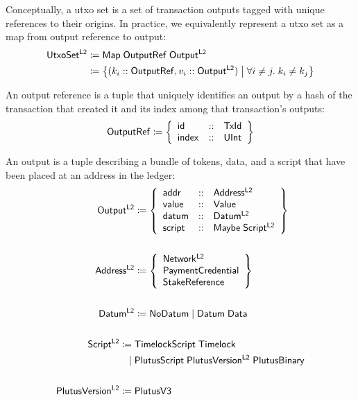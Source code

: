\documentclass[../hydrozoa.tex]{subfiles}
\begin{document}
Conceptually, a utxo set is a set of transaction outputs tagged with unique references to their origins.
In practice, we equivalently represent a utxo set as a map from output reference to output:
\begin{equation*}
\begin{split}
  \mathsf{UtxoSet^{L2}} &\coloneq \mathsf{Map} \; \mathsf{OutputRef} \; \mathsf{Output^{L2}} \\
    &\coloneq \left\{
      (k_i :: \mathsf{OutputRef}, v_i :: \mathsf{Output^{L2}})
      \;\middle|\;
      \forall i \neq j.\; k_i \neq k_j
    \right\}
\end{split}
\end{equation*}

An output reference is a tuple that uniquely identifies an output by a hash of the transaction that created it and its index among that transaction's outputs:
\begin{equation*}
  \mathsf{OutputRef} \coloneq \left\{
    \begin{array}{lll}
      \mathsf{id} &::& \mathsf{TxId} \\
      \mathsf{index} &::& \mathsf{UInt}
    \end{array} \right\}
\end{equation*}

An output is a tuple describing a bundle of tokens, data, and a script that have been placed at an address in the ledger:
\begin{equation*}
\begin{split}
  \mathsf{Output^{L2}} &\coloneq \left\{
  \begin{array}{lll}
    \mathsf{addr} &::& \mathsf{Address^{L2}} \\
      \mathsf{value} &::& \mathsf{Value} \\
      \mathsf{datum} &::& \mathsf{Datum^{L2}} \\
      \mathsf{script} &::& \mathsf{Maybe} \; \mathsf{Script^{L2}}
  \end{array} \right\} \\\\
  \mathsf{Address^{L2}} &\coloneq \left\{
    \begin{array}{l}
      \mathsf{Network^{L2}} \\
      \mathsf{PaymentCredential} \\
      \mathsf{StakeReference}
    \end{array}\right\} \\\\
  \mathsf{Datum^{L2}} &\coloneq \mathsf{NoDatum} \mid \mathsf{Datum} \; \mathsf{Data} \\\\
  \mathsf{Script^{L2}} \coloneq\;& \mathsf{TimelockScript} \; \mathsf{Timelock} \\
                        \mid\;& \mathsf{PlutusScript} \; \mathsf{PlutusVersion^{L2}} \; \mathsf{PlutusBinary} \\\\
  \mathsf{PlutusVersion^{L2}} \coloneq\;& \mathsf{PlutusV3}
\end{split}
\end{equation*}
\end{document}
